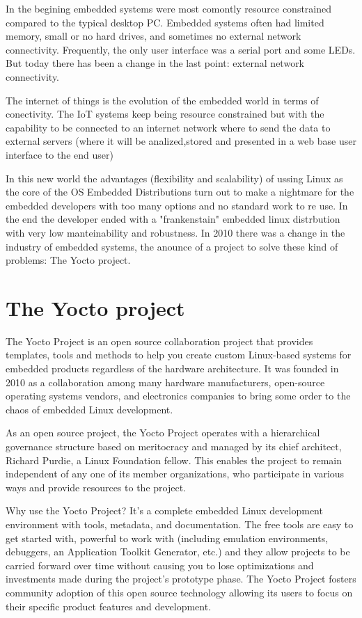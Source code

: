 In the begining embedded systems were most comontly resource constrained
compared to the typical desktop PC. Embedded systems often had limited memory,
small or no hard drives, and sometimes no external network connectivity.
Frequently, the only user interface was a serial port and some LEDs. But today
there has been a change in the last point: external network connectivity.

The internet of things is the evolution of the embedded world in terms of
conectivity. The IoT systems keep being resource constrained but with the
capability to be connected to an internet network where to send the data to
external servers (where it will be analized,stored and presented in a web base
user interface to the end user)

In this new world the advantages (flexibility and scalability) of ussing Linux
as the core of the OS Embedded Distributions turn out to make a nightmare for
the embedded developers with too many options and no standard work to re use.
In the end the developer ended with a "frankenstain" embedded linux
distrbution with very low manteinability and robustness. In 2010 there was a
change in the industry of embedded systems, the anounce of a project to solve
these kind of problems: The Yocto project.

\section{The Yocto project}
\noindent
The Yocto Project is an open source collaboration project that provides
templates, tools and methods to help you create custom Linux-based systems for
embedded products regardless of the hardware architecture. It was founded in
2010 as a collaboration among many hardware manufacturers, open-source
operating systems vendors, and electronics companies to bring some order to the
chaos of embedded Linux development.

As an open source project, the Yocto Project operates with a hierarchical
governance structure based on meritocracy and managed by its chief architect,
Richard Purdie, a Linux Foundation fellow. This enables the project to remain
independent of any one of its member organizations, who participate in various
ways and provide resources to the project.

Why use the Yocto Project? It's a complete embedded Linux development
environment with tools, metadata, and documentation. The
free tools are easy to get started with, powerful to work with (including
emulation environments, debuggers, an Application Toolkit Generator, etc.) and
they allow projects to be carried forward over time without causing you to lose
optimizations and investments made during the project’s prototype phase. The
Yocto Project fosters community adoption of this open source technology
allowing its users to focus on their specific product features and development.

